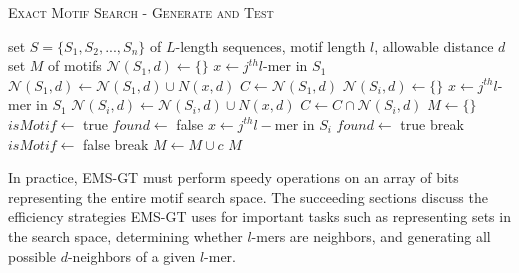\documentclass[oneside,12pt]{DISCSthesis}
\begin{document}
		{ %
			\noindent\hspace*{6pt}{\bf Algorithm 2.1} \textsc{Exact Motif Search - Generate and Test}\small
			\begin{algorithmic}[1] \label{alg:EMS-GT}
			\Require set $S = \{S_{1},S_{2},...,S_{n}\}$ of $L$-length sequences, \newline \hspace*{25pt}motif length $l$, allowable distance $d$
			\Ensure set $M$ of motifs \vspace*{6pt}
			\State $\mathcal{N}(S_{1},d) \leftarrow \{\}$
										\hspace*{200pt}
				\State $x \leftarrow j^{th} l$-mer in $S_{1}$			
				\State $\mathcal{N}(S_{1},d) \leftarrow \mathcal{N}(S_{1},d) \cup N(x,d)$
			\EndFor
			\State $C \leftarrow \mathcal{N}(S_{1},d)$
				\State $\mathcal{N}(S_{i}, d) \leftarrow \{\}$
					\State $x \leftarrow j^{th} l$-mer in $S_{1}$
					\State $\mathcal{N}(S_{i},d) \leftarrow \mathcal{N}(S_{i},d) \cup N(x,d)$
				\EndFor
				\State $C \leftarrow C \cap \mathcal{N}(S_{i},d)$
			\EndFor
			\State $M \leftarrow \{\}$										
											\hspace*{190pt}
				\State $isMotif \leftarrow$ true
					\State $found \leftarrow$ false
						\State $x \leftarrow j^{th} l-$mer in $S_{i}$
							\State $found \leftarrow$ true
							\State break
						\EndIf
					\EndFor
					\If{!$found$}
						\State $isMotif \leftarrow$ false
						\State break
					\EndIf
				\EndFor
				\If{$isMotif$}
					\State $M \leftarrow M \cup c$
				\EndIf
			\EndFor
			\State\Return $M$
			\end{algorithmic}
			}\newpage

		In practice, EMS-GT must perform speedy operations on an array of bits representing the entire motif search space. The succeeding sections discuss the efficiency strategies EMS-GT uses for important tasks such as representing sets in the search space, determining whether $l$-mers are neighbors, and generating all possible $d$-neighbors of a given $l$-mer.
\end{document}
